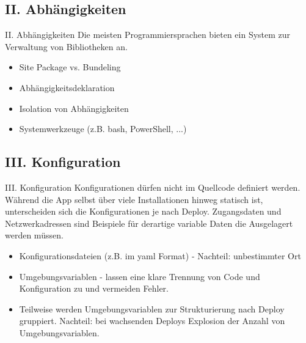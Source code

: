 \documentclass{beamer}
\begin{document}
			\subsection{II. Abhängigkeiten}
				\begin{frame}{II. Abhängigkeiten}
					Die meisten Programmiersprachen bieten ein System zur Verwaltung von Bibliotheken an.
					\begin{itemize}
						\item Site Package vs. Bundeling
						\item Abhängigkeitsdeklaration
						\item Isolation von Abhängigkeiten
						\item Systemwerkzeuge (z.B. bash, PowerShell, ...)
					\end{itemize}
				\end{frame}
			\subsection{III. Konfiguration}
				\begin{frame}{III. Konfiguration}
					Konfigurationen dürfen nicht im Quellcode definiert werden. Während die App selbst über viele Installationen hinweg statisch ist, unterscheiden sich die Konfigurationen je nach Deploy. Zugangsdaten und Netzwerkadressen sind Beispiele für derartige variable Daten die Ausgelagert werden müssen.
					\begin{itemize}
						\item Konfigurationsdateien (z.B. im yaml Format) - Nachteil: unbestimmter Ort
						\item Umgebungsvariablen - lassen eine klare Trennung von Code und Konfiguration zu und vermeiden Fehler. 
						\item Teilweise werden Umgebungsvariablen zur Strukturierung nach Deploy gruppiert. Nachteil: bei wachsenden Deploys Explosion der Anzahl von Umgebungsvariablen.
					\end{itemize} 
				\end{frame}
\end{document}
